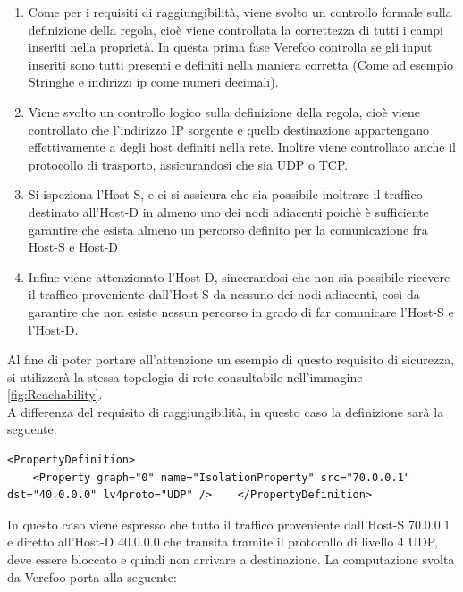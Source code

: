 \begin{enumerate}
    \item  Come per i requisiti di raggiungibilità, viene svolto un controllo formale sulla definizione della regola, cioè viene controllata la correttezza di tutti i campi inseriti nella proprietà. In questa prima fase
        Verefoo controlla se gli input inseriti sono tutti presenti e definiti nella maniera corretta (Come ad esempio Stringhe e indirizzi ip come numeri decimali).
    \item Viene svolto un controllo logico sulla definizione della regola, cioè viene controllato che l'indirizzo IP sorgente e quello destinazione appartengano effettivamente a degli host definiti
        nella rete. Inoltre viene controllato anche il protocollo di trasporto, assicurandosi che sia UDP o TCP.
    \item Si ispeziona l'Host-S, e ci si assicura che sia possibile inoltrare il traffico destinato all'Host-D in almeno uno dei nodi adiacenti poichè è sufficiente garantire che esista almeno un percorso
        definito per la comunicazione fra Host-S e Host-D
    \item Infine viene attenzionato l'Host-D, sincerandosi che non sia possibile ricevere il traffico proveniente dall'Host-S da nessuno dei nodi adiacenti, così da garantire che non esiste nessun percorso in grado di
    far comunicare l'Host-S e l'Host-D.
\end{enumerate}

Al fine di poter portare all'attenzione un esempio di questo requisito di sicurezza, si utilizzerà la stessa topologia di rete 
consultabile nell'immagine \ref{fig:Reachability}.\\
A differenza del requisito di raggiungibilità, in questo caso la definizione sarà la seguente:\\

\begin{lstlisting}[style=mystyle,caption={Esempio di requisito di isolamento}]
    <PropertyDefinition>
    <Property graph="0" name="IsolationProperty" src="70.0.0.1" dst="40.0.0.0" lv4proto="UDP" />    </PropertyDefinition>
    \end{lstlisting}

In questo caso viene espresso che tutto il traffico proveniente dall'Host-S 70.0.0.1 e diretto all'Host-D 40.0.0.0 che transita
tramite il protocollo di livello 4 UDP, deve essere bloccato e quindi non arrivare a destinazione.
La computazione svolta da Verefoo porta alla seguente:

